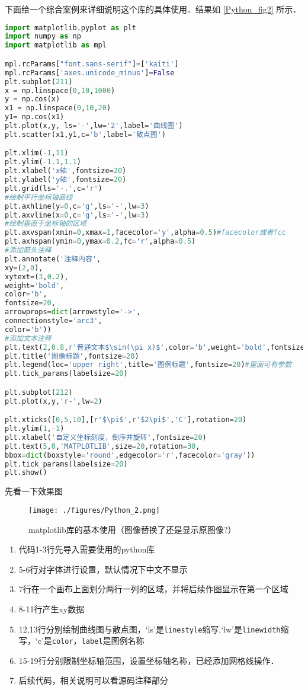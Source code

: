 下面给一个综合案例来详细说明这个库的具体使用．结果如 \autoref{Python_fig2} 所示．
\begin{lstlisting}[language=python]
import matplotlib.pyplot as plt
import numpy as np
import matplotlib as mpl

mpl.rcParams["font.sans-serif"]=['kaiti']
mpl.rcParams['axes.unicode_minus']=False
plt.subplot(211)
x = np.linspace(0,10,1000)
y = np.cos(x)
x1 = np.linspace(0,10,20)
y1= np.cos(x1)
plt.plot(x,y, ls='-',lw='2',label='曲线图')
plt.scatter(x1,y1,c='b',label='散点图')

plt.xlim(-1,11)
plt.ylim(-1.1,1.1)
plt.xlabel('x轴',fontsize=20)
plt.ylabel('y轴',fontsize=20)
plt.grid(ls='-.',c='r')
#绘制平行坐标轴直线
plt.axhline(y=0,c='g',ls='-',lw=3)
plt.axvline(x=0,c='g',ls='-',lw=3)
#绘制垂直于坐标轴的区域
plt.axvspan(xmin=0,xmax=1,facecolor='y',alpha=0.5)#facecolor或者fcc
plt.axhspan(ymin=0,ymax=0.2,fc='r',alpha=0.5)
#添加箭头注释
plt.annotate('注释内容',
xy=(2,0),
xytext=(3,0.2),
weight='bold',
color='b',
fontsize=20,
arrowprops=dict(arrowstyle='->',
connectionstyle='arc3',
color='b'))
#添加文本注释
plt.text(2,0.8,r'普通文本$\sin(\pi x)$',color='b',weight='bold',fontsize=20)
plt.title('图像标题',fontsize=20)
plt.legend(loc='upper right',title='图例标题',fontsize=20)#里面可有参数
plt.tick_params(labelsize=20)

plt.subplot(212)
plt.plot(x,y,'r-',lw=2)

plt.xticks([0,5,10],[r'$\pi$',r'$2\pi$','C'],rotation=20)
plt.ylim(1,-1)
plt.xlabel('自定义坐标刻度，倒序并旋转',fontsize=20)
plt.text(5,0,'MATPLOTLIB',size=20,rotation=30,
bbox=dict(boxstyle='round',edgecolor='r',facecolor='gray'))
plt.tick_params(labelsize=20)
plt.show()
\end{lstlisting}
先看一下效果图

\begin{figure}[ht]
\centering
\texttt{[image: ./figures/Python\_2.png]}
\caption{matplotlib库的基本使用（图像替换了还是显示原图像?）} \label{Python_fig2}
\end{figure}

\begin{enumerate}
\item 代码1-3行先导入需要使用的python库
\item 5-6行对字体进行设置，默认情况下中文不显示
\item 7行在一个画布上面划分两行一列的区域，并将后续作图显示在第一个区域
\item 8-11行产生xy数据
\item 12,13行分别绘制曲线图与散点图，‘ls’是\verb|linestyle|缩写,‘lw’是\verb|linewidth|缩写，‘c’是\verb|color|，\verb|label|是图例名称
\item 15-19行分别限制坐标轴范围，设置坐标轴名称，已经添加网格线操作．
\item 后续代码，相关说明可以看源码注释部分
\end{enumerate}

